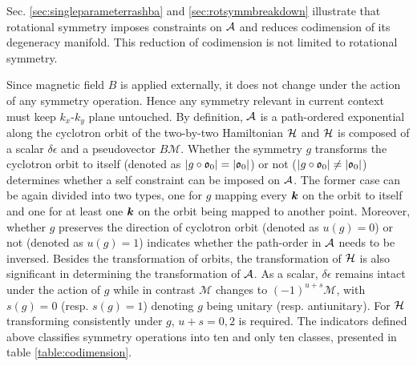 \documentclass[aps, prb, showpacs, twocolumn, notitlepage, superscriptaddress]{revtex4-1}
\begin{document}
Sec. \ref{sec:singleparameterrashba} and \ref{sec:rotsymmbreakdown} illustrate that rotational symmetry imposes constraints on ${\cal A}$ and reduces codimension of its degeneracy manifold. This reduction of codimension is not limited to rotational symmetry.

Since magnetic field $B$ is applied externally, it does not change under the action of any symmetry operation. Hence any symmetry relevant in current context must keep $k_x$-$k_y$ plane untouched. By definition, ${\cal A}$ is a path-ordered exponential along the cyclotron orbit of the two-by-two Hamiltonian $\mathcal{H}$ and $\mathcal{H}$ is composed of a scalar $\delta\epsilon$ and a pseudovector $B\mathcal{M}$. Whether the symmetry $g$ transforms the cyclotron orbit to itself (denoted as $|g\circ\mathfrak{o}_0|=|\mathfrak{o}_0|$) or not ($|g\circ\mathfrak{o}_0|\ne|\mathfrak{o}_0|$) determines whether a self constraint can be imposed on ${\cal A}$. The former case can be again divided into two types, one for $g$ mapping every $\boldsymbol{k}$ on the orbit to itself and one for at least one $\boldsymbol{k}$ on the orbit being mapped to another point. Moreover, whether $g$ preserves the direction of cyclotron orbit (denoted as $u(g)=0$) or not (denoted as $u(g)=1$) indicates whether the path-order in ${\cal A}$ needs to be inversed. Besides the transformation of orbits, the transformation of $\mathcal{H}$ is also significant in determining the transformation of ${\cal A}$. As a scalar, $\delta\epsilon$ remains intact under the action of $g$ while in contrast $\mathcal{M}$ changes to $(-1)^{u+s}\mathcal{M}$, with $s(g)=0$ (resp. $s(g)=1$) denoting $g$ being unitary (resp. antiunitary). For $\mathcal{H}$ transforming consistently under $g$, $u+s=0, 2$ is required. The indicators defined above classifies symmetry operations into ten and only ten classes, presented in table \ref{table:codimension}.
\end{document}
